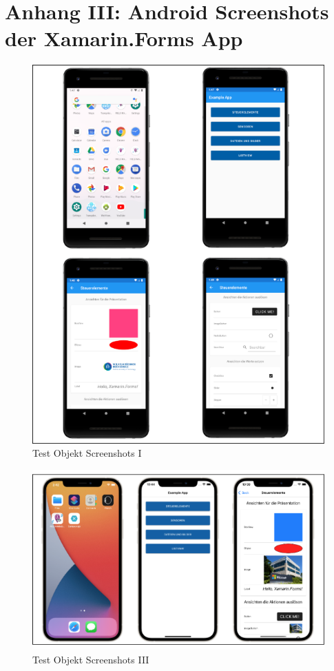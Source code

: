 \chapter{Anhang III: Android Screenshots der Xamarin.Forms App}
\label{chap:AnhangAndroidScreenshots}


\begin{figure}[!ht]
 \includegraphics[width=\textwidth,keepaspectratio]{Images/Screenshot/AndroidScrenshotI.png}
 \caption[]{Test Objekt Screenshots I}
\end{figure}


\begin{figure}[!ht]
 \includegraphics[width=\textwidth,keepaspectratio]{Images/Screenshot/AppIconAndMenu.png}
 \caption[]{Test Objekt Screenshots III}
\end{figure}


